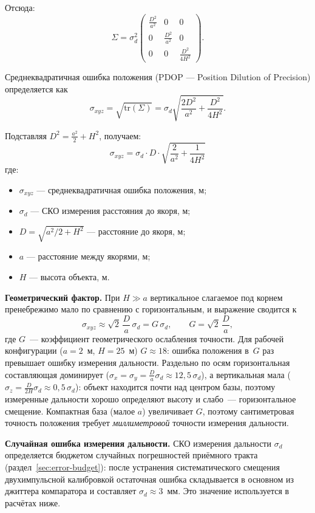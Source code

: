 Отсюда:
$$
\Sigma = \sigma_d^2
\begin{pmatrix}
\frac{D^2}{a^2} & 0 & 0 \\
0 & \frac{D^2}{a^2} & 0 \\
0 & 0 & \frac{D^2}{4H^2}
\end{pmatrix}.
$$

Среднеквадратичная ошибка положения (PDOP — Position Dilution of Precision) определяется как
$$
\sigma_{xyz} = \sqrt{\mathrm{tr}(\Sigma)} = \sigma_d \sqrt{\frac{2D^2}{a^2} + \frac{D^2}{4H^2}}.
$$

Подставляя $D^2 = \frac{a^2}{2} + H^2$, получаем:
$$
\boxed{
\sigma_{xyz} = \sigma_d \cdot D \cdot \sqrt{\frac{2}{a^2} + \frac{1}{4H^2}}
}
$$
где:
\begin{itemize}
    \item $\sigma_{xyz}$ — среднеквадратичная ошибка положения, м;
    \item $\sigma_d$ — СКО измерения расстояния до якоря, м;
    \item $D = \sqrt{a^2/2 + H^2}$ — расстояние до якоря, м;
    \item $a$ — расстояние между якорями, м;
    \item $H$ — высота объекта, м.
\end{itemize}

\textbf{Геометрический фактор.} При $H \gg a$ вертикальное слагаемое под корнем
пренебрежимо мало по сравнению с горизонтальным, и выражение сводится к
$$
\sigma_{xyz} \approx \sqrt{2}\,\frac{D}{a}\,\sigma_d = G\,\sigma_d,
\qquad G = \sqrt{2}\,\frac{D}{a},
$$
где $G$~--- коэффициент геометрического ослабления точности. Для рабочей конфигурации
($a = 2$~м, $H = 25$~м) $G \approx 18$: ошибка положения в~$G$ раз превышает ошибку
измерения дальности. Раздельно по осям горизонтальная составляющая доминирует
($\sigma_x = \sigma_y = \tfrac{D}{a}\sigma_d \approx 12{,}5\,\sigma_d$), а вертикальная
мала ($\sigma_z = \tfrac{D}{2H}\sigma_d \approx 0{,}5\,\sigma_d$): объект находится почти
над центром базы, поэтому измеренные дальности хорошо определяют высоту и слабо~---
горизонтальное смещение. Компактная база (малое $a$) увеличивает $G$, поэтому
сантиметровая точность положения требует \emph{миллиметровой} точности измерения
дальности.

\textbf{Случайная ошибка измерения дальности.} СКО измерения дальности $\sigma_d$
определяется бюджетом случайных погрешностей приёмного тракта (раздел~\ref{sec:error-budget}):
после устранения систематического смещения двухимпульсной калибровкой остаточная ошибка
складывается в основном из джиттера компаратора и составляет $\sigma_d \approx 3$~мм. Это
значение используется в расчётах ниже.

